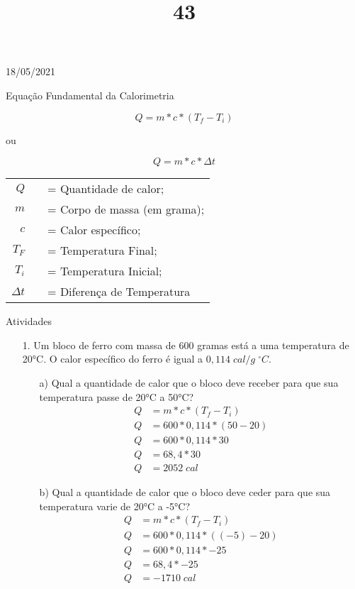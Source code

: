 \documentclass{SchoolBook}
\begin{document}
    \begin{day}{18/05/2021}
        \title{4}{Equação Fundamental da Calorimetria}
        
        $$ Q = m * c * (T_f - T_i) $$
        \begin{center}
            ou
        \end{center}
        $$ Q = m * c * \Delta t $$
        
        \vspace{6pt}
        \begin{tabular}{ r c l }
                   $ Q $ &&= Quantidade de calor;       \\
                   $ m $ &&= Corpo de massa (em grama); \\
                   $ c $ &&= Calor específico;          \\
                 $ T_F $ &&= Temperatura Final;         \\
                 $ T_i $ &&= Temperatura Inicial;       \\
            $ \Delta t $ &&= Diferença de Temperatura 
        \end{tabular}
        \vspace{6pt}
        
        \title{3}{Atividades}
        
        \begin{enumerate}
            \item[1.] Um bloco de ferro com massa de 600 gramas está a uma temperatura de 20°C. O calor específico do ferro é igual a $ 0,114\;cal/g\;^\circ C $.
            \begin{enumerate}
                \item[a)] Qual a quantidade de calor que o bloco deve receber para que sua temperatura passe de 20°C a 50°C?
                \begin{align*}
                    Q &= m * c * (T_f - T_i)     \\
                    Q &= 600 * 0,114 * (50 - 20) \\
                    Q &= 600 * 0,114 * 30        \\
                    Q &= 68,4 * 30               \\
                    Q &= 2052\;cal
                \end{align*}
                
                \item[b)] Qual a quantidade de calor que o bloco deve ceder para que sua temperatura varie de 20°C a -5°C?
                \begin{align*}
                    Q &= m * c * (T_f - T_i)       \\
                    Q &= 600 * 0,114 * ((-5) - 20) \\
                    Q &= 600 * 0,114 * -25         \\
                    Q &= 68,4 * -25                \\
                    Q &= -1710\;cal
                \end{align*}
                

\end{enumerate}
\end{enumerate}
\end{day}
\end{document}
